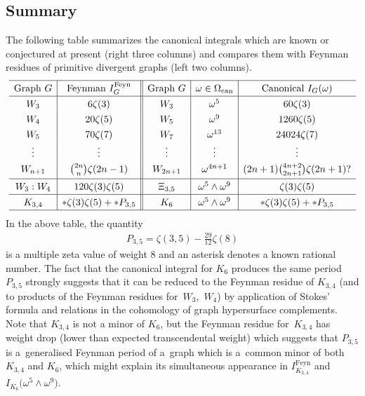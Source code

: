 \documentclass[pdftex]{sigma}%
\numberwithin{equation}{section}
\newcommand{\can}{\mathrm{can}}
\newcommand{\0}{\color{blue}{\mathsf{0}}}
\begin{document}
\subsection{Summary}
 The following table summarizes the canonical integrals which are known or conjectured at present (right three columns) and compares them with Feynman residues of primitive divergent graphs (left two columns).
\begin{gather*}
\setlength{\tabcolsep}{4.5pt}\def\arraystretch{1.3}
\begin{array}{c|c||c|c|c} \hline
\text{Graph } G & \text{Feynman } I_G^{\mathrm{Feyn}} & \text{Graph } G & \omega\in \Omega_{\can} &\text{Canonical } I_G(\omega) \\ \hline %
W_3 & 6 \zeta(3) & W_3 & \omega^5 & 60 \zeta(3) \\
 W_4 & 20 \zeta(5) & W_5 & \omega^9 & 1260 \zeta(5) \\
W_5 & 70 \zeta(7) & W_7 & \omega^{13} & 24024 \zeta(7) \\
\vdots & \vdots & \vdots & \vdots &\vdots
\\
 W_{n+1} & \binom{2n}{n} \zeta(2n-1) & W_{2n+1} & \omega^{4n+1} & (2n+1) \binom{4n+2}{2n+1} \zeta(2n+1) ? \\[2pt] \hline
 W_3:W_4 & 120 \zeta(3) \zeta(5) & \Xi_{3,5} & \omega^{5} \wedge \omega^9 & \zeta(3) \zeta(5) \\ \hline
 K_{3,4} & * \zeta(3) \zeta(5) + * P_{3,5} & K_6 & \omega^{5} \wedge \omega^9 & * \zeta(3) \zeta(5) + *P_{3,5} \\ \hline
\end{array}
\end{gather*}
In the above table, the quantity
\begin{gather*}
P_{3,5} = \zeta(3,5) - \frac{29}{12} \zeta(8)
\end{gather*}
is a multiple zeta value of weight 8 and an asterisk denotes a known rational number.
The fact that the canonical integral for $K_6$ produces the same period $P_{3,5}$ strongly suggests that it can be reduced to the Feynman residue of $K_{3,4}$ (and to products of the Feynman residues for~$W_3$,~$W_4$) by application of Stokes' formula and relations in the cohomology of graph hypersurface complements. Note that $K_{3,4}$ is not a minor of $K_6$, but the Feynman residue for~$K_{3,4}$ has weight drop (lower than expected transcendental weight) which suggests that $P_{3,5}$ is a~generalised Feynman period of a~graph which is a~common minor of both $K_{3,4}$ and $K_6$, which might explain its simultaneous appearance in $I^{\mathrm{Feyn}}_{K_{3,4}}$ and $I_{K_6}\big(\omega^5 \wedge \omega^9\big)$.
\end{document}
